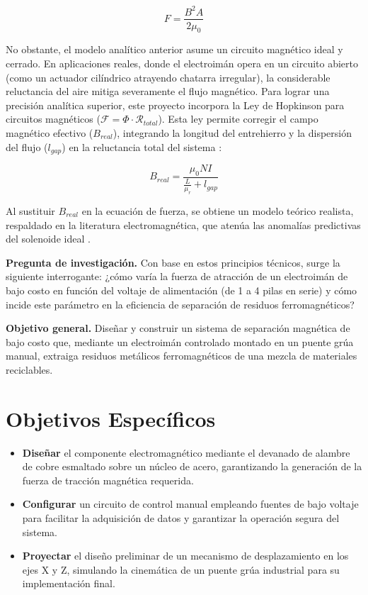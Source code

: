 \begin{equation}
  F = \frac{B^2 A}{2\mu_0}
\end{equation}

No obstante, el modelo analítico anterior asume un circuito magnético ideal y cerrado. En aplicaciones reales, donde el electroimán opera en un circuito abierto (como un actuador cilíndrico atrayendo chatarra irregular), la considerable reluctancia del aire mitiga severamente el flujo magnético. Para lograr una precisión analítica superior, este proyecto incorpora la Ley de Hopkinson para circuitos magnéticos ($\mathcal{F} = \Phi \cdot \mathcal{R}_{total}$). Esta ley permite corregir el campo magnético efectivo ($B_{real}$), integrando la longitud del entrehierro y la dispersión del flujo ($l_{gap}$) en la reluctancia total del sistema \parencite{hayt2012}:

\begin{equation}
  B_{real} = \frac{\mu_0 N I}{\frac{L}{\mu_r} + l_{gap}}
\end{equation}

Al sustituir $B_{real}$ en la ecuación de fuerza, se obtiene un modelo teórico realista, respaldado en la literatura electromagnética, que atenúa las anomalías predictivas del solenoide ideal \parencite{hayt2012}.

\textbf{Pregunta de investigación.} Con base en estos principios técnicos, surge la siguiente interrogante: ¿cómo varía la fuerza de atracción de un electroimán de bajo costo en función del voltaje de alimentación (de 1 a 4 pilas en serie) y cómo incide este parámetro en la eficiencia de separación de residuos ferromagnéticos?

\textbf{Objetivo general.} Diseñar y construir un sistema de separación magnética de bajo costo que, mediante un electroimán controlado montado en un puente grúa manual, extraiga residuos metálicos ferromagnéticos de una mezcla de materiales reciclables.

\section{Objetivos Específicos}

\begin{itemize}
    \item \textbf{Diseñar} el componente electromagnético mediante el devanado de alambre de cobre esmaltado sobre un núcleo de acero, garantizando la generación de la fuerza de tracción magnética requerida.
    \item \textbf{Configurar} un circuito de control manual empleando fuentes de bajo voltaje para facilitar la adquisición de datos y garantizar la operación segura del sistema.
    \item \textbf{Proyectar} el diseño preliminar de un mecanismo de desplazamiento en los ejes X y Z, simulando la cinemática de un puente grúa industrial para su implementación final.
\end{itemize}

